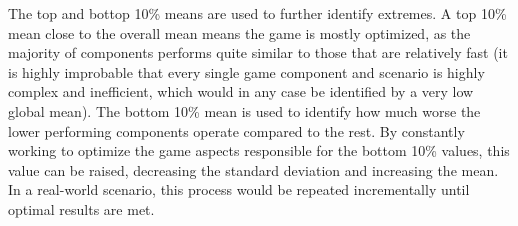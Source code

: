 The top and bottop 10\% means are used to further identify extremes. A top 10\% mean close to the overall mean means the game is mostly optimized, as the majority of components performs quite similar to those that are relatively fast (it is highly improbable that every single game component and scenario is highly complex and inefficient, which would in any case be identified by a very low global mean). The bottom 10\% mean is used to identify how much worse the lower performing components operate compared to the rest. By constantly working to optimize the game aspects responsible for the bottom 10\% values, this value can be raised, decreasing the standard deviation and increasing the mean. In a real-world scenario, this process would be repeated incrementally until optimal results are met.